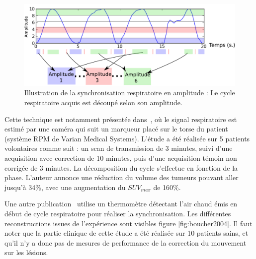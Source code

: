 \begin{figure}[h!]
	\begin{center}
		\includegraphics[width=12cm]{images/gatingAmplitude}
	\end{center}
	\caption{Illustration de la synchronisation respiratoire en amplitude : Le cycle respiratoire acquis est découpé selon son amplitude.} 
	\label{fig:gatingRespiAmplitude}
\end{figure}


Cette technique est notamment présentée dans~\cite{nehmeh2002effect}, où le signal respiratoire est estimé par une caméra qui suit un marqueur placé sur le torse du patient (système RPM de Varian Medical Systems). L'étude a été réalisée sur 5 patients volontaires comme suit : un scan de transmission de 3 minutes, suivi d'une acquisition avec correction de 10 minutes, puis d'une acquisition témoin non corrigée de 3 minutes. La décomposition du cycle s'effectue en fonction de la phase. L'auteur annonce une réduction du volume des tumeurs pouvant aller jusqu'à 34\%, avec une augmentation du $SUV_{max}$ de 160\%. 

Une autre publication~\cite{boucher2004respiratory} utilise un thermomètre détectant l'air chaud émis en début de cycle respiratoire pour réaliser la synchronisation. Les différentes reconstructions issues de l'expérience sont visibles figure \ref{fig:boucher2004}. Il faut noter que la partie clinique de cette étude a été réalisée sur 10 patients sains, et qu'il n'y a donc pas de mesures de performance de la correction du mouvement sur les lésions. 

